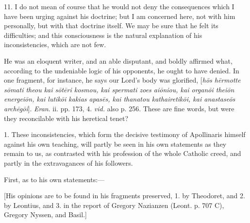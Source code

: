 11. I do not mean of course that he would not deny the consequences
which I have been urging against his doctrine; but I am concerned
here, not with him personally, but with that doctrine itself. We may
be sure that he felt its difficulties; and this consciousness is the
natural explanation of his inconsistencies, which are not few.

He was an eloquent writer, and an able disputant, and boldly
affirmed what, according to the undeniable logic of his opponents, he
ought to have denied. In one fragment, for instance, he says our Lord's
body was glorified, [\emph{h\={o}s h\={e}rmotte s\={o}mati theou
kai s\={o}t\={e}ri kosmou, kai spermati zoes ai\={o}niou,
kai organ\={o}i thei\={o}n energei\={o}n, kai lutik\={o}i
kakias apas\={e}s, kai thanatou kathairetik\={o}i, kai anastase\={o}s
arch\={e}g\={o}i}]. \emph{Eran}. ii. pp. 173, 4. \emph{vid.}
also p. 256. These are fine words, but were they reconcilable with
his heretical tenet?


1. These inconsistencies, which form the decisive testimony of
Apollinaris himself against his own teaching, will partly be seen in
his own statements as they remain to us, as contrasted with his
profession of the whole Catholic creed, and partly in the
extravagances of his followers.

First, as to his own statements:—

[His opinions are to be found in his fragments preserved, 1. by
Theodoret, and 2. by Leontius, and 3. in the report of Gregory
Nazianzen (Leont. p. 707 C), Gregory Nyssen, and Basil.]

